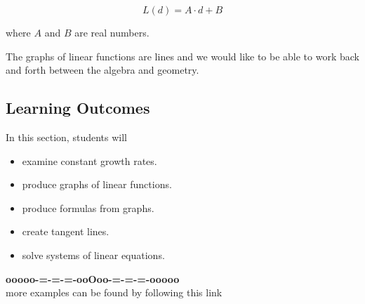\documentclass{ximera}
\begin{document}
\[  L(d) = A \cdot d + B \]

where $A$ and $B$ are real numbers.


The graphs of linear functions are lines and we would like to be able to work back and forth between the algebra and geometry.
















\subsection*{Learning Outcomes}



\begin{sectionOutcomes}
In this section, students will 

\begin{itemize}
\item examine constant growth rates.
\item produce graphs of linear functions.
\item produce formulas from graphs.
\item create tangent lines.
\item solve systems of linear equations.
\end{itemize}
\end{sectionOutcomes}

















\begin{center}
\textbf{\textcolor{green!50!black}{ooooo-=-=-=-ooOoo-=-=-=-ooooo}} \\

more examples can be found by following this link\\ 

\end{center}
\end{document}
